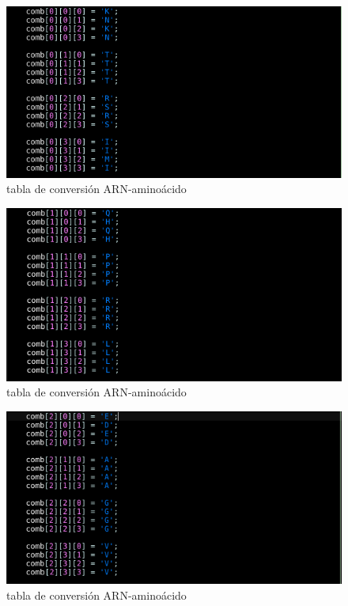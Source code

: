\documentclass[11pt]{article}
\begin{document}
\begin{itemize}
	\begin{figure}[H]
		\centering
		\includegraphics[scale=0.9]{amino_2.png}
		\caption{tabla de conversión ARN-aminoácido}
		\label{fig:fam2}
	\end{figure}
	
	\begin{figure}[H]
		\centering
		\includegraphics[scale=0.9]{amino_3.png}
		\caption{tabla de conversión ARN-aminoácido}
		\label{fig:fam3}
	\end{figure}
	
	\begin{figure}[H]
		\centering
		\includegraphics[scale=0.9]{amino_4.png}
		\caption{tabla de conversión ARN-aminoácido}
		\label{fig:fam4}
	\end{figure}
	

\end{itemize}
\end{document}
